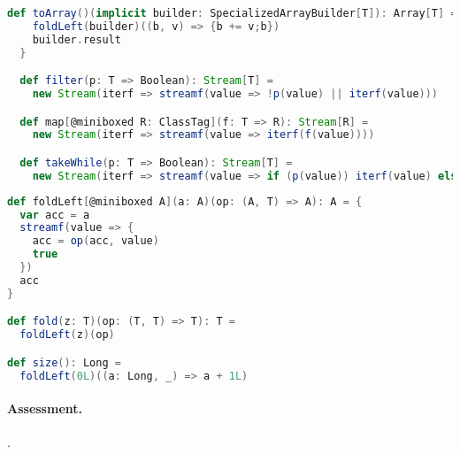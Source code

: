 \begin{lstlisting}[language=scala]
  def toArray()(implicit builder: SpecializedArrayBuilder[T]): Array[T] = {
    foldLeft(builder)((b, v) => {b += v;b})
    builder.result
  }

  def filter(p: T => Boolean): Stream[T] =
    new Stream(iterf => streamf(value => !p(value) || iterf(value)))

  def map[@miniboxed R: ClassTag](f: T => R): Stream[R] = 
    new Stream(iterf => streamf(value => iterf(f(value))))

  def takeWhile(p: T => Boolean): Stream[T] = 
    new Stream(iterf => streamf(value => if (p(value)) iterf(value) else false))
\end{lstlisting}

\begin{lstlisting}[language=scala]
def foldLeft[@miniboxed A](a: A)(op: (A, T) => A): A = {
  var acc = a
  streamf(value => {
    acc = op(acc, value)
    true
  })
  acc
}

def fold(z: T)(op: (T, T) => T): T = 
  foldLeft(z)(op)

def size(): Long = 
  foldLeft(0L)((a: Long, _) => a + 1L)
\end{lstlisting}

\paragraph{Assessment. } .